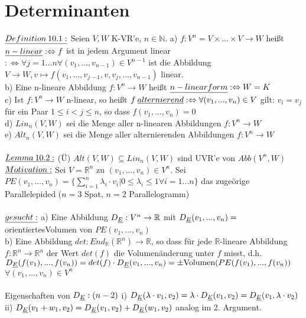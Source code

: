 \documentclass[fleqn, a4paper, 11pt]{article}
\begin{document}
\section{Determinanten}

$\uline{Definition\:10.1:}$ Seien $V,W$ K-VR'e, $n\in\mathbb{N}$. a) $f:V^n=V\times\dots\times V\rightarrow W$ hei\ss{}t $\uline{n-linear}:\Leftrightarrow f$ ist in jedem Argument linear $:\Leftrightarrow\forall j=1...n\forall(v_1,...,v_{n-1})\in V^{n-1}$ ist die Abbildung $V\rightarrow W,v\mapsto f(v_1,...,v_{j-1},v,v_j,...,v_{n-1})$ linear.\\
b) Eine n-lineare Abbildung $f:V^n\rightarrow W$ hei\ss{}t $\uline{n-linearform}:\Leftrightarrow W=K$\\
c) Ist $f:V^n\rightarrow W$ n-linear, so hei\ss{}t $f\:\uline{alternierend}:\Leftrightarrow \forall(v_1,...,v_n)\in V$ gilt: $v_i=v_j$ f\"ur ein Paar $1\leq i<j\leq n$, so dass $f(v_1,...,v_n)=0$\\
d) $Lin_n(V,W)$ sei die Menge aller n-linearen Abbildungen $f:V^n\rightarrow W$\\
e) $Alt_n(V,W)$ sei die Menge aller alternierenden Abbildungen $f:V^n\rightarrow W$\\
\\
$\uline{Lemma\:10.2:}$ (\"U) $Alt(V,W)\subseteq Lin_n(V,W)$ sind UVR'e von $Abb(V^n,W)$\\
$\uline{Motivation:}$ Sei $V=\mathbb{R}^n$ zu $(v_1,...,v_n)\in V^n$. Sei $PE(v_1,...,v_n)=\{\sum\limits_{i=1}^n \lambda_i\cdot v_i | 0\leq \lambda_i \leq 1 \forall i=1...n\}$ das zuge\"orige Parallelepided ($n=3$ Spat, $n=2$ Parallelogramm)\\
\\
$\uline{gesucht:}$ a) Eine Abbildung $D_{\uline{E}}:V^n\rightarrow\mathbb{R}$ mit $D_{\uline{E}}(v_1,...,v_n)=$\dq orientiertes\dq Volumen von $PE(v_1,...,v_n)$\\
b) Eine Abbildung $det:End_{\mathbb{R}}(\mathbb{R}^n)\rightarrow\mathbb{R}$, so dass f\"ur jede $\mathbb{R}$-lineare Abbildung $f:\mathbb{R}^n\rightarrow\mathbb{R}^n$ der Wert $det(f)$ die Volumen\"anderung unter $f$ misst, d.h. $D_{\uline{E}}(f(v_1),...,f(v_n))=det(f)\cdot D_{\uline{E}}(v_1,...,v_n)=\pm \text{Volumen}(PE(f(v_1),...,f(v_n))$ $\forall(v_1,...,v_n)\in V^n$\\
\\
Eigenschaften von $D_{\uline{E}}:(n-2)$ i) $D_{\uline{E}}(\lambda\cdot v_1,v_2)=\lambda\cdot D_{\uline{E}}(v_1,v_2)=D_{\uline{E}}(v_1,\lambda\cdot v_2)$\\
ii) $D_{\uline{E}}(v_1 +w_1,v_2)=D_{\uline{E}}(v_1,v_2)+D_{\uline{E}}(w_1,v_2)$ analog im 2. Argument.\\
\end{document}
